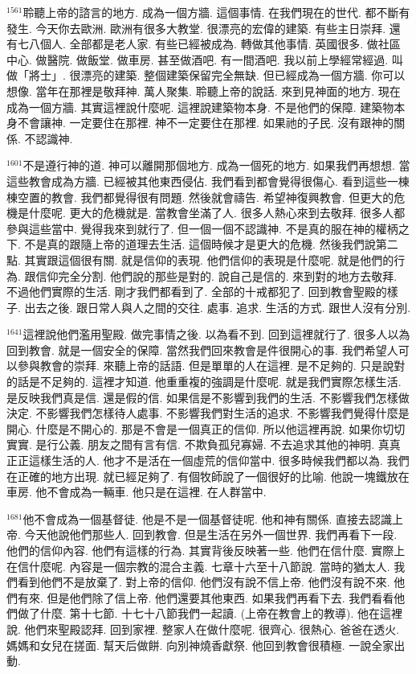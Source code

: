 \documentclass{book}
\begin{document}
$^{1561}$聆聽上帝的諮言的地方.
成為一個方牆.
這個事情.
在我們現在的世代.
都不斷有發生.
今天你去歐洲.
歐洲有很多大教堂.
很漂亮的宏偉的建築.
有些主日崇拜.
還有七八個人.
全部都是老人家.
有些已經被成為.
轉做其他事情.
英國很多.
做社區中心.
做醫院.
做飯堂.
做車房.
甚至做酒吧.
有一間酒吧.
我以前上學經常經過.
叫做「將士」.
很漂亮的建築.
整個建築保留完全無缺.
但已經成為一個方牆.
你可以想像.
當年在那裡是敬拜神.
萬人聚集.
聆聽上帝的說話.
來到見神面的地方.
現在成為一個方牆.
其實這裡說什麼呢.
這裡說建築物本身.
不是他們的保障.
建築物本身不會讓神.
一定要住在那裡.
神不一定要住在那裡.
如果祂的子民.
沒有跟神的關係.
不認識神.

$^{1601}$不是遵行神的道.
神可以離開那個地方.
成為一個死的地方.
如果我們再想想.
當這些教會成為方牆.
已經被其他東西侵佔.
我們看到都會覺得很傷心.
看到這些一棟棟空置的教會.
我們都覺得很有問題.
然後就會禱告.
希望神復興教會.
但更大的危機是什麼呢.
更大的危機就是.
當教會坐滿了人.
很多人熱心來到去敬拜.
很多人都參與這些當中.
覺得我來到就行了.
但一個一個不認識神.
不是真的服在神的權柄之下.
不是真的跟隨上帝的道理去生活.
這個時候才是更大的危機.
然後我們說第二點.
其實跟這個很有關.
就是信仰的表現.
他們信仰的表現是什麼呢.
就是他們的行為.
跟信仰完全分割.
他們說的那些是對的.
說自己是信的.
來到對的地方去敬拜.
不過他們實際的生活.
剛才我們都看到了.
全部的十戒都犯了.
回到教會聖殿的樣子.
出去之後.
跟日常人與人之間的交往.
處事.
追求.
生活的方式.
跟世人沒有分別.

$^{1641}$這裡說他們濫用聖殿.
做完事情之後.
以為看不到.
回到這裡就行了.
很多人以為回到教會.
就是一個安全的保障.
當然我們回來教會是件很開心的事.
我們希望人可以參與教會的崇拜.
來聽上帝的話語.
但是單單的人在這裡.
是不足夠的.
只是說對的話是不足夠的.
這裡才知道.
他重重複的強調是什麼呢.
就是我們實際怎樣生活.
是反映我們真是信.
還是假的信.
如果信是不影響到我們的生活.
不影響我們怎樣做決定.
不影響我們怎樣待人處事.
不影響我們對生活的追求.
不影響我們覺得什麼是開心.
什麼是不開心的.
那是不會是一個真正的信仰.
所以他這裡再說.
如果你切切實實.
是行公義.
朋友之間有言有信.
不欺負孤兒寡婦.
不去追求其他的神明.
真真正正這樣生活的人.
他才不是活在一個虛荒的信仰當中.
很多時候我們都以為.
我們在正確的地方出現.
就已經足夠了.
有個牧師說了一個很好的比喻.
他說一塊鐵放在車房.
他不會成為一輛車.
他只是在這裡.
在人群當中.

$^{1681}$他不會成為一個基督徒.
他是不是一個基督徒呢.
他和神有關係.
直接去認識上帝.
今天他說他們那些人.
回到教會.
但是生活在另外一個世界.
我們再看下一段.
他們的信仰內容.
他們有這樣的行為.
其實背後反映著一些.
他們在信什麼.
實際上在信什麼呢.
內容是一個宗教的混合主義.
七章十六至十八節說.
當時的猶太人.
我們看到他們不是放棄了.
對上帝的信仰.
他們沒有說不信上帝.
他們沒有說不來.
他們有來.
但是他們除了信上帝.
他們還要其他東西.
如果我們再看下去.
我們看看他們做了什麼.
第十七節.
十七十八節我們一起讀.
(上帝在教會上的教導).
他在這裡說.
他們來聖殿認拜.
回到家裡.
整家人在做什麼呢.
很齊心.
很熱心.
爸爸在透火.
媽媽和女兒在搓面.
幫天后做餅.
向別神燒香獻祭.
他回到教會很積極.
一說全家出動.
\end{document}
